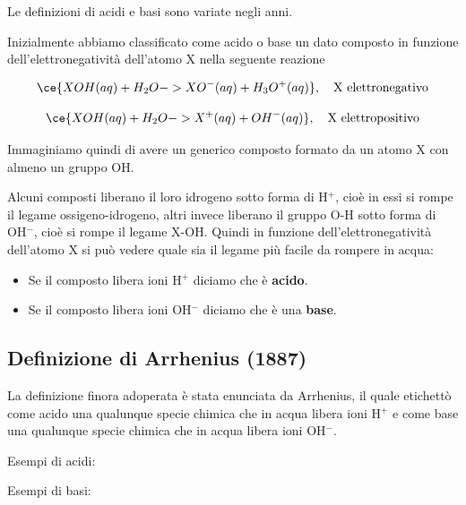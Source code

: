 
\normalsize Le definizioni di acidi e basi sono variate negli anni.

Inizialmente abbiamo classificato come acido o base un dato composto in funzione dell'elettronegatività dell'atomo X nella seguente reazione

$$\ce{XOH(aq) + H_2O -> XO^-(aq) + H_3O^+(aq)}, \quad \text{X elettronegativo}$$

$$\ce{XOH(aq) + H_2O -> X^+(aq) + OH^-(aq)}, \quad \text{X elettropositivo}$$

Immaginiamo quindi di avere un generico composto formato da un atomo X con almeno un gruppo OH.

Alcuni composti liberano il loro idrogeno sotto forma di H$^+$, cioè in essi si rompe il legame ossigeno-idrogeno, altri invece liberano il gruppo O-H sotto forma di OH$^-$, cioè si rompe il legame X-OH. Quindi in funzione dell'elettronegatività dell'atomo X si può vedere quale sia il legame più facile da rompere in acqua:

\begin{itemize}
    \item Se il composto libera ioni H$^+$ diciamo che è \textbf{acido}.
    \item Se il composto libera ioni OH$^-$ diciamo che è una \textbf{base}.
\end{itemize}

\subsection{Definizione di Arrhenius (1887)}
La definizione finora adoperata è stata enunciata da Arrhenius, il quale etichettò come acido una qualunque specie chimica che in acqua libera ioni H$^+$ e come base una qualunque specie chimica che in acqua libera ioni OH$^-$.

\vspace{0.2cm}Esempi di acidi:

\vspace{0.2cm}

\vspace{0.2cm}

\vspace{0.2cm}

\vspace{0.2cm}Esempi di basi:

\vspace{0.2cm}

